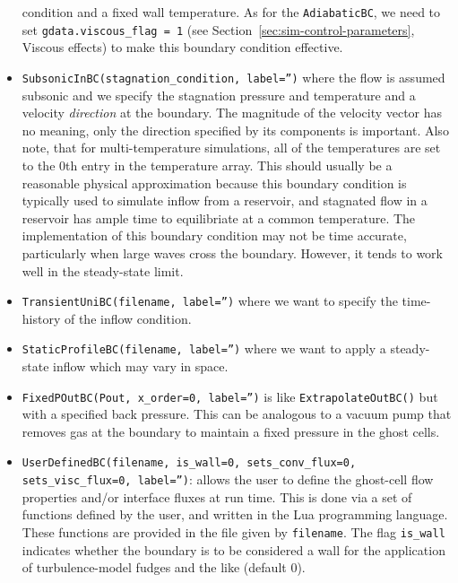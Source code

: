 \begin{itemize}
      condition and a fixed wall temperature.
      As for the \texttt{AdiabaticBC}, we need to set \verb!gdata.viscous_flag = 1! (see Section~\ref{sec:sim-control-parameters}, Viscous effects) 
      to make this boundary condition effective.
    \item \texttt{SubsonicInBC(stagnation\_condition, label='')} where the flow is assumed subsonic and
      we specify the stagnation pressure and temperature and a velocity \emph{direction} at the boundary. The magnitude of the velocity vector has
      no meaning, only the direction specified by its components is important. Also note, that for multi-temperature simulations, all of the temperatures
      are set to the 0th entry in the temperature array. This should usually be a reasonable physical approximation because this boundary condition
      is typically used to simulate inflow from a reservoir, and stagnated flow in a reservoir has ample time to equilibriate at a common temperature.
      The implementation of this boundary condition may not be time accurate, particularly when large waves cross the boundary. However, it
      tends to work well in the steady-state limit.
    \item \texttt{TransientUniBC(filename, label='')} where we want to specify the time-history of
      the inflow condition.
    \item \texttt{StaticProfileBC(filename, label='')} where we want to apply a steady-state inflow
       which may vary in space.
    \item \texttt{FixedPOutBC(Pout, x\_order=0, label='')} 
      is like \texttt{ExtrapolateOutBC()} but with a specified back pressure.
      This can be analogous to a vacuum pump that removes gas at the boundary to maintain
      a fixed pressure in the ghost cells.
    \item \texttt{UserDefinedBC(filename, is\_wall=0, sets\_conv\_flux=0, sets\_visc\_flux=0, label='')}: 
       allows the user to define the ghost-cell flow properties and/or interface fluxes at run time.
       This is done via a set of functions defined by the user, and written in the Lua
       programming language.
       These functions are provided in the file given by \texttt{filename}.
       The flag \texttt{is\_wall} indicates whether the boundary is to be considered
       a wall for the application of turbulence-model fudges and the like (default 0).

\end{itemize}
